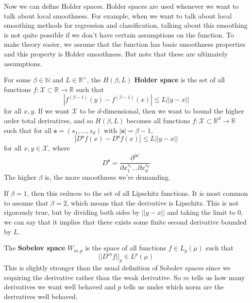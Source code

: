   Now we can define Holder spaces. Holder spaces are used whenever we want to talk about local smoothness. For example, when we want to talk about local smoothing methods for regression and classification, talking about this smoothing is not quite possible if we don't have certain assumptions on the function. To make theory easier, we assume that the function has basic smoothness properties and this property is Holder smoothness. But note that these are ultimately assumptions. 


  \begin{definition}
    For some $\beta \in \mathbb{N}$ and $L \in \mathbb{R}^+$, the $H(\beta, L)$ \textbf{Holder space} is the set of all functions $f: \mathcal{X} \subset \mathbb{R} \rightarrow \mathbb{R}$ such that 
    \begin{equation}
      |f^{(\beta - 1)}(y) - f^{(\beta - 1)}(x)| \leq L ||y - x||
    \end{equation}
    for all $x, y$. If we want $\mathcal{X}$ to be $d$-dimensional, then we want to bound the higher order total derivatives, and so $H(\beta, L)$ becomes all functions $f: \mathcal{X} \subset \mathbb{R}^d \rightarrow \mathbb{R}$ such that for all $\mathbf{s} = (s_1, \ldots, s_d)$ with $|\mathbf{s}| = \beta - 1$,
    \begin{equation}
      |D^{\mathbf{s}} f(x) - D^{\mathbf{s}} f(x)| \leq L ||y - x||
    \end{equation}
    for all $x, y \in \mathcal{X}$, where 
    \begin{equation}
      D^{\mathbf{s}} = \frac{\partial^{|\mathbf{s}|}}{\partial x_1^{s_1} \ldots \partial x_d^{s_d}} 
    \end{equation}
    The higher $\beta$ is, the more smoothness we're demanding. 
  \end{definition}

  If $\beta = 1$, then this reduces to the set of all Lipschitz functions. It is most common to assume that $\beta = 2$, which means that the derivative is Lipschitz. This is not rigorously true, but by dividing both sides by $||y - x||$ and taking the limit to $0$, we can say that it implies that there exists some finite second derivative bounded by $L$. 

  \begin{definition}
    The \textbf{Sobelov space} $W_{m, p}$ is the space of all functions $f \in L_p (\mu)$ such that 
    \begin{equation}
      ||D^m f||_p \in L^p (\mu)
    \end{equation}
    This is slightly stronger than the usual definition of Sobolev spaces since we requiring the derivative rather than the weak derivative. So $m$ tells us how many derivatives we want well behaved and $p$ tells us under which norm are the derivatives well behaved. 
  \end{definition}

